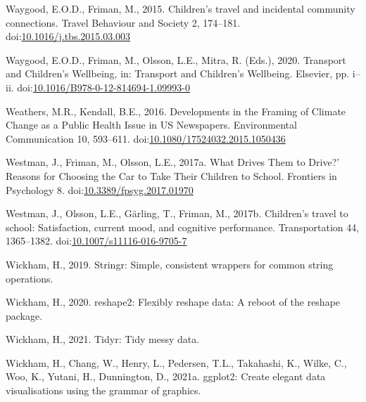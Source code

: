 \documentclass[]{elsarticle} %
\newlength{\cslhangindent}
\newlength{\cslentryspacingunit} %
\newenvironment{CSLReferences}[2] %
 {%
  \setlength{\parindent}{0pt}
  \ifodd #1
  \let\oldpar\par
  \def\par{\hangindent=\cslhangindent\oldpar}
  \fi
  \setlength{\parskip}{#2\cslentryspacingunit}
 }%
 {}
\begin{document}
\begin{CSLReferences}{1}{0}
\leavevmode{}%
Waygood, E.O.D., Friman, M., 2015. Children's travel and incidental
community connections. Travel Behaviour and Society 2, 174--181.
doi:\href{https://doi.org/10.1016/j.tbs.2015.03.003}{10.1016/j.tbs.2015.03.003}

\leavevmode{}%
Waygood, E.O.D., Friman, M., Olsson, L.E., Mitra, R. (Eds.), 2020.
Transport and {Children}'s {Wellbeing}, in: Transport and {Children}'s
{Wellbeing}. {Elsevier}, pp. i--ii.
doi:\href{https://doi.org/10.1016/B978-0-12-814694-1.09993-0}{10.1016/B978-0-12-814694-1.09993-0}

\leavevmode{}%
Weathers, M.R., Kendall, B.E., 2016. Developments in the {Framing} of
{Climate Change} as a {Public Health Issue} in {US Newspapers}.
Environmental Communication 10, 593--611.
doi:\href{https://doi.org/10.1080/17524032.2015.1050436}{10.1080/17524032.2015.1050436}

\leavevmode{}%
Westman, J., Friman, M., Olsson, L.E., 2017a. What {Drives Them} to
{Drive}?' {Reasons} for {Choosing} the {Car} to
{Take Their Children} to {School}. Frontiers in Psychology 8.
doi:\href{https://doi.org/10.3389/fpsyg.2017.01970}{10.3389/fpsyg.2017.01970}

\leavevmode{}%
Westman, J., Olsson, L.E., Gärling, T., Friman, M., 2017b. Children's
travel to school: Satisfaction, current mood, and cognitive performance.
Transportation 44, 1365--1382.
doi:\href{https://doi.org/10.1007/s11116-016-9705-7}{10.1007/s11116-016-9705-7}

\leavevmode{}%
Wickham, H., 2019. Stringr: Simple, consistent wrappers for common
string operations.

\leavevmode{}%
Wickham, H., 2020. reshape2: Flexibly reshape data: A reboot of the
reshape package.

\leavevmode{}%
Wickham, H., 2021. Tidyr: Tidy messy data.

\leavevmode{}%
Wickham, H., Chang, W., Henry, L., Pedersen, T.L., Takahashi, K., Wilke,
C., Woo, K., Yutani, H., Dunnington, D., 2021a. ggplot2: Create elegant
data visualisations using the grammar of graphics.


\end{CSLReferences}
\end{document}
